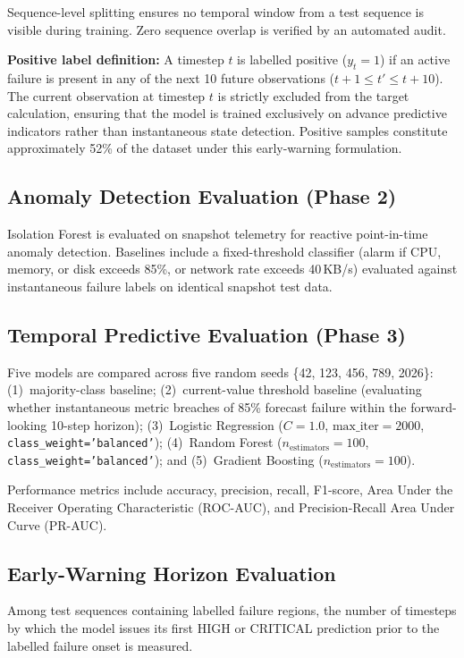\documentclass[conference]{IEEEtran}
\begin{document}
Sequence-level splitting ensures no temporal window from a test sequence is visible during training. Zero sequence overlap is verified by an automated audit.

\textbf{Positive label definition:} A timestep $t$ is labelled positive ($y_t = 1$) if an active failure is present in any of the next 10 future observations ($t+1 \le t' \le t+10$). The current observation at timestep $t$ is strictly excluded from the target calculation, ensuring that the model is trained exclusively on advance predictive indicators rather than instantaneous state detection. Positive samples constitute approximately 52\% of the dataset under this early-warning formulation.

\subsection{Anomaly Detection Evaluation (Phase 2)}

Isolation Forest is evaluated on snapshot telemetry for reactive point-in-time anomaly detection. Baselines include a fixed-threshold classifier (alarm if CPU, memory, or disk exceeds 85\%, or network rate exceeds 40\,KB/s) evaluated against instantaneous failure labels on identical snapshot test data.

\subsection{Temporal Predictive Evaluation (Phase 3)}

Five models are compared across five random seeds \{42, 123, 456, 789, 2026\}: (1)~majority-class baseline; (2)~current-value threshold baseline (evaluating whether instantaneous metric breaches of 85\% forecast failure within the forward-looking 10-step horizon); (3)~Logistic Regression ($C=1.0$, $\text{max\_iter}=2000$, \texttt{class\_weight='balanced'}); (4)~Random Forest ($n_{\text{estimators}}=100$, \texttt{class\_weight='balanced'}); and (5)~Gradient Boosting ($n_{\text{estimators}}=100$).

Performance metrics include accuracy, precision, recall, F1-score, Area Under the Receiver Operating Characteristic (ROC-AUC), and Precision-Recall Area Under Curve (PR-AUC).

\subsection{Early-Warning Horizon Evaluation}

Among test sequences containing labelled failure regions, the number of timesteps by which the model issues its first HIGH or CRITICAL prediction prior to the labelled failure onset is measured.
\end{document}
